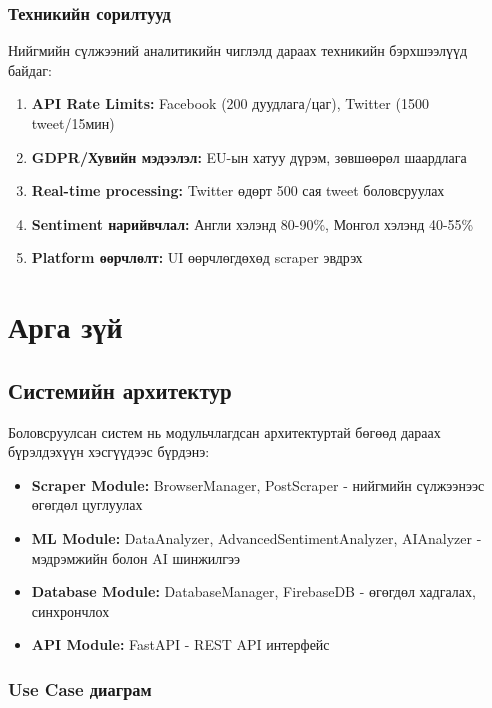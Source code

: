 \documentclass[12pt,a4paper]{report}
\begin{document}
\subsection{Техникийн сорилтууд}

Нийгмийн сүлжээний аналитикийн чиглэлд дараах техникийн бэрхшээлүүд байдаг:

\begin{enumerate}
    \item \textbf{API Rate Limits:} Facebook (200 дуудлага/цаг), Twitter (1500 tweet/15мин)
    \item \textbf{GDPR/Хувийн мэдээлэл:} EU-ын хатуу дүрэм, зөвшөөрөл шаардлага
    \item \textbf{Real-time processing:} Twitter өдөрт 500 сая tweet боловсруулах
    \item \textbf{Sentiment нарийвчлал:} Англи хэлэнд 80-90\%, Монгол хэлэнд 40-55\%
    \item \textbf{Platform өөрчлөлт:} UI өөрчлөгдөхөд scraper эвдрэх
\end{enumerate}

\chapter{Арга зүй}

\section{Системийн архитектур}

Боловсруулсан систем нь модульчлагдсан архитектуртай бөгөөд дараах бүрэлдэхүүн хэсгүүдээс бүрдэнэ:

\begin{itemize}
    \item \textbf{Scraper Module:} BrowserManager, PostScraper - нийгмийн сүлжээнээс өгөгдөл цуглуулах
    \item \textbf{ML Module:} DataAnalyzer, AdvancedSentimentAnalyzer, AIAnalyzer - мэдрэмжийн болон AI шинжилгээ
    \item \textbf{Database Module:} DatabaseManager, FirebaseDB - өгөгдөл хадгалах, синхрончлох
    \item \textbf{API Module:} FastAPI - REST API интерфейс
\end{itemize}

\subsection{Use Case диаграм}
\end{document}

